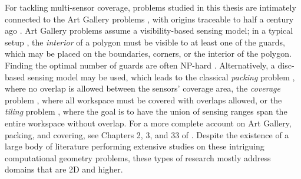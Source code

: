For tackling multi-sensor coverage, problems studied in this thesis are intimately connected to the Art 
Gallery problems \cite{o1987art,shermer1992recent}, with origins traceable 
to half a century ago \cite{klee1969every}. Art Gallery problems assume 
a visibility-based \cite{lozano1979algorithm} sensing model; in a typical 
setup \cite{o1987art}, the {\em interior} of a polygon must be visible to at 
least one of the guards, which may be placed on the boundaries, corners, 
or the interior of the polygon. Finding the optimal number of guards are 
often NP-hard \cite{lee1986computational}. Alternatively, a disc-based sensing 
model may be used, which leads to the classical {\em packing} problem 
\cite{thue1910dichteste,hales2005proof}, where no overlap is allowed between 
the sensors' coverage area, the {\em coverage} problem 
\cite{drezner1995facility,cortes2004coverage,pavone2009equitable,martinez2010distributed,pierson2017adapting}, 
where all 
workspace must be covered with overlaps allowed, or the {\em tiling} problem 
\cite{kershner1968paving}, where the goal is to have the union of sensing
ranges span the entire workspace without overlap. For a more complete 
account on Art Gallery, packing, and covering, see Chapters 2, 3, and 33 of
\cite{toth2017handbook}. Despite the existence of a large body of literature 
performing extensive studies on these intriguing computational geometry 
problems, these types of research mostly address domains that are 2D and 
higher.





